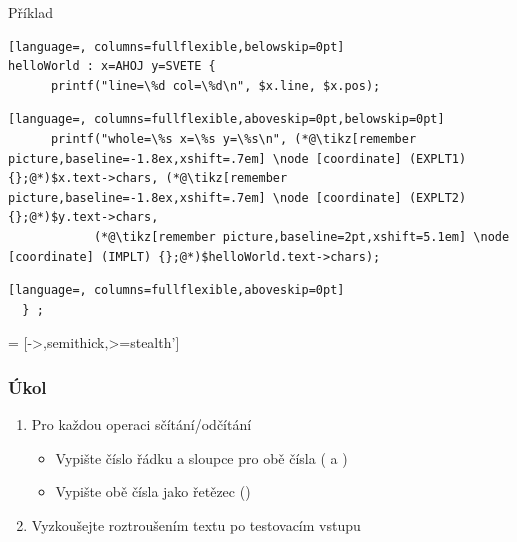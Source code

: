 \begin{frame}[fragile]

  \begin{block}{Příklad}
  \begin{lstlisting}[language=, columns=fullflexible,belowskip=0pt]
helloWorld : x=AHOJ y=SVETE {
      printf("line=\%d col=\%d\n", $x.line, $x.pos);
  \end{lstlisting}
  \begin{lstlisting}[language=, columns=fullflexible,aboveskip=0pt,belowskip=0pt]
      printf("whole=\%s x=\%s y=\%s\n", (*@\tikz[remember picture,baseline=-1.8ex,xshift=.7em] \node [coordinate] (EXPLT1) {};@*)$x.text->chars, (*@\tikz[remember picture,baseline=-1.8ex,xshift=.7em] \node [coordinate] (EXPLT2) {};@*)$y.text->chars,
            (*@\tikz[remember picture,baseline=2pt,xshift=5.1em] \node [coordinate] (IMPLT) {};@*)$helloWorld.text->chars);
  \end{lstlisting} %
  \begin{lstlisting}[language=, columns=fullflexible,aboveskip=0pt]
  } ;
  \end{lstlisting}
  \end{block}

   = [->,semithick,>=stealth']

\end{frame}

\begin{frame}
  \frametitle{Úkol}

  \begin{enumerate}
    \item Pro každou operaci sčítání/odčítání
    \begin{itemize}
      \item Vypište číslo řádku a sloupce pro obě čísla ( a
	)
      \item Vypište obě čísla jako řetězec ()
    \end{itemize}
    \item Vyzkoušejte roztroušením textu po testovacím vstupu
  \end{enumerate}

\end{frame}

